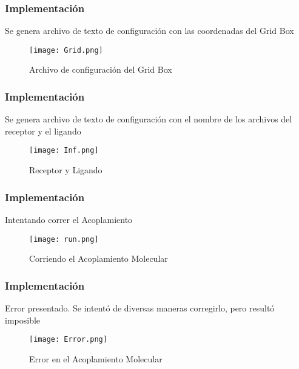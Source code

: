 \documentclass{beamer}
\begin{document}
\begin{frame}\frametitle{Implementación}
Se genera archivo de texto de configuración con las coordenadas del Grid Box
  \begin{figure}[h]
      \centering
      \texttt{[image: Grid.png]}
      \caption{Archivo de configuración del Grid Box}
      \label{fig:my_label}
  \end{figure}  
\end{frame} 


\begin{frame}\frametitle{Implementación}
Se genera archivo de texto de configuración con el nombre de los archivos del receptor y el ligando
  \begin{figure}[h]
      \centering
      \texttt{[image: Inf.png]}
      \caption{Receptor y Ligando}
      \label{fig:my_label}
  \end{figure}  
\end{frame} 


\begin{frame}\frametitle{Implementación}
Intentando correr el Acoplamiento
  \begin{figure}[h]
      \centering
      \texttt{[image: run.png]}
      \caption{Corriendo el Acoplamiento Molecular}
      \label{fig:my_label}
  \end{figure}  
\end{frame} 


\begin{frame}\frametitle{Implementación}
Error presentado. Se intentó de diversas maneras corregirlo, pero resultó imposible
  \begin{figure}[h]
      \centering
      \texttt{[image: Error.png]}
      \caption{Error en el Acoplamiento Molecular}
      \label{fig:my_label}
  \end{figure}  
\end{frame}
\end{document}
